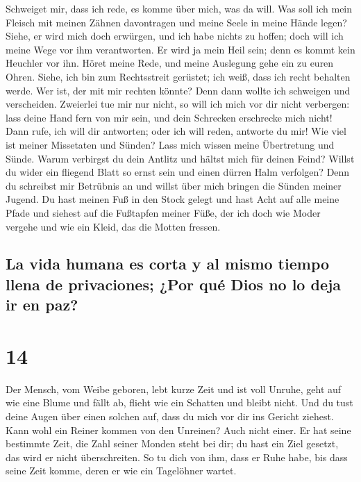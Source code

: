  Schweiget mir, dass ich rede, es komme über mich, was da
will.  Was soll ich mein Fleisch mit meinen Zähnen
davontragen und meine Seele in meine Hände legen?  Siehe,
er wird mich doch erwürgen, und ich habe nichts zu hoffen; doch will ich
meine Wege vor ihm verantworten.  Er wird ja mein Heil
sein; denn es kommt kein Heuchler vor ihn.  Höret meine
Rede, und meine Auslegung gehe ein zu euren Ohren. 
Siehe, ich bin zum Rechtsstreit gerüstet; ich weiß, dass ich recht
behalten werde.  Wer ist, der mit mir rechten könnte?
Denn dann wollte ich schweigen und verscheiden. 
Zweierlei tue mir nur nicht, so will ich mich vor dir nicht verbergen:
 lass deine Hand fern von mir sein, und dein Schrecken
erschrecke mich nicht!  Dann rufe, ich will dir
antworten; oder ich will reden, antworte du mir!  Wie
viel ist meiner Missetaten und Sünden? Lass mich wissen meine
Übertretung und Sünde.  Warum verbirgst du dein Antlitz
und hältst mich für deinen Feind?  Willst du wider ein
fliegend Blatt so ernst sein und einen dürren Halm verfolgen?
 Denn du schreibst mir Betrübnis an und willst über mich
bringen die Sünden meiner Jugend.  Du hast meinen Fuß in
den Stock gelegt und hast Acht auf alle meine Pfade und siehest auf die
Fußtapfen meiner Füße,  der ich doch wie Moder vergehe
und wie ein Kleid, das die Motten fressen.

\hypertarget{la-vida-humana-es-corta-y-al-mismo-tiempo-llena-de-privaciones-por-quuxe9-dios-no-lo-deja-ir-en-paz}{%
\subsection{La vida humana es corta y al mismo tiempo llena de
privaciones; ¿Por qué Dios no lo deja ir en
paz?}\label{la-vida-humana-es-corta-y-al-mismo-tiempo-llena-de-privaciones-por-quuxe9-dios-no-lo-deja-ir-en-paz}}

\hypertarget{section-13}{%
\section{14}\label{section-13}}

 Der Mensch, vom Weibe geboren, lebt kurze Zeit und ist
voll Unruhe,  geht auf wie eine Blume und fällt ab, flieht
wie ein Schatten und bleibt nicht.  Und du tust deine
Augen über einen solchen auf, dass du mich vor dir ins Gericht ziehest.
 Kann wohl ein Reiner kommen von den Unreinen? Auch nicht
einer.  Er hat seine bestimmte Zeit, die Zahl seiner
Monden steht bei dir; du hast ein Ziel gesetzt, das wird er nicht
überschreiten.  So tu dich von ihm, dass er Ruhe habe, bis
dass seine Zeit komme, deren er wie ein Tagelöhner wartet.

